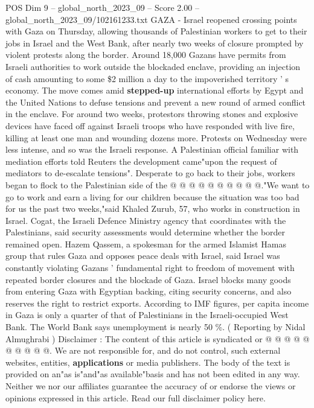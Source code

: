 \begin{textsample}{POS Dim 9 – global\_north\_2023\_09 – Score 2.00 – global\_north\_2023\_09/102161233.txt}  \label{ex:f9_pos_006}
GAZA - Israel reopened crossing points with Gaza on Thursday, allowing thousands of Palestinian workers to get to their jobs in Israel and the West Bank, after nearly two weeks of closure prompted by violent protests along the border.
Around 18,000 Gazans have permits from Israeli authorities to work outside the blockaded enclave, providing an injection of cash amounting to some \$2 million a day to the impoverished territory ' s economy.
The move comes amid \textbf{stepped-up} international efforts by Egypt and the United Nations to defuse tensions and prevent a new round of armed conflict in the enclave.
For around two weeks, protestors throwing stones and explosive devices have faced off against Israeli troops who have responded with live fire, killing at least one man and wounding dozens more.
Protests on Wednesday were less intense, and so was the Israeli response.
A Palestinian official familiar with mediation efforts told Reuters the development came"upon the request of mediators to de-escalate tensions".
Desperate to go back to their jobs, workers began to flock to the Palestinian side of the @ @ @ @ @ @ @ @ @ @."We want to go to work and earn a living for our children because the situation was too bad for us the past two weeks,"said Khaled Zurub, 57, who works in construction in Israel.
Cogat, the Israeli Defence Ministry agency that coordinates with the Palestinians, said security assessments would determine whether the border remained open.
Hazem Qassem, a spokesman for the armed Islamist Hamas group that rules Gaza and opposes peace deals with Israel, said Israel was constantly violating Gazans ' fundamental right to freedom of movement with repeated border closures and the blockade of Gaza.
Israel blocks many goods from entering Gaza with Egyptian backing, citing security concerns, and also reserves the right to restrict exports.
According to IMF figures, per capita income in Gaza is only a quarter of that of Palestinians in the Israeli-occupied West Bank.
The World Bank says unemployment is nearly 50 \%. ( Reporting by Nidal Almughrabi ) Disclaimer : The content of this article is syndicated or @ @ @ @ @ @ @ @ @ @.
We are not responsible for, and do not control, such external websites, entities, \textbf{applications} or media publishers.
The body of the text is provided on an"as is"and"as available"basis and has not been edited in any way.
Neither we nor our affiliates guarantee the accuracy of or endorse the views or opinions expressed in this article.
Read our full disclaimer policy here.

\end{textsample}
